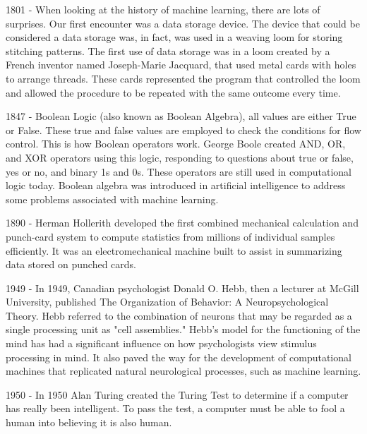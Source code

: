\documentclass[english,12pt,oneside,a4paper]{article}
\begin{document}
		1801 - When looking at the history of machine learning, there are lots of surprises. Our first encounter was a data storage device. The device that could be considered a data storage was, in fact, was used in a weaving loom for storing stitching patterns. The first use of data storage was in a loom created by a French inventor named Joseph-Marie Jacquard, that used metal cards with holes to arrange threads. These cards represented the program that controlled the loom and allowed the procedure to be repeated with the same outcome every time.
		
		1847 - Boolean Logic (also known as Boolean Algebra), all values are either True or False. These true and false values are employed to check the conditions for flow control. This is how Boolean operators work. George Boole created AND, OR, and XOR operators using this logic, responding to questions about true or false, yes or no, and binary 1s and 0s. These operators are still used in computational logic today.
		Boolean algebra was introduced in artificial intelligence to address some problems associated with machine learning.
		
		1890 - Herman Hollerith developed the first combined mechanical calculation and punch-card system to compute statistics from millions of individual samples efficiently. It was an electromechanical machine built to assist in summarizing data stored on punched cards.
		
		1949 - In 1949, Canadian psychologist Donald O. Hebb, then a lecturer at McGill University, published The Organization of Behavior: A Neuropsychological Theory. Hebb referred to the combination of neurons that may be regarded as a single processing unit as "cell assemblies."
		Hebb's model for the functioning of the mind has had a significant influence on how psychologists view stimulus processing in mind. It also paved the way for the development of computational machines that replicated natural neurological processes, such as machine learning.
		
		1950 - In 1950 Alan Turing created the Turing Test to determine if a computer has really been intelligent. To pass the test, a computer must be able to fool a human into believing it is also human.
\end{document}
